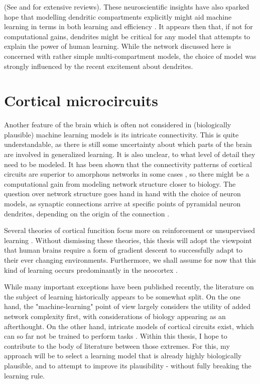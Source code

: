 (See \citep{Larkum2022} and \citep{Poirazi2020} for extensive reviews). These neuroscientific insights have also sparked
hope that modelling dendritic compartments explicitly might aid machine learning in terms in both learning and
efficiency \citep{Chavlis2021,guerguiev2017towards,Richards2019,Eyal2018}. It appears then that, if not for
computational gains, dendrites might be critical for any model that attempts to explain the power of human learning.
While the network discussed here is concerned with rather simple multi-compartment models, the choice of model was
strongly influenced by the recent excitement about dendrites.




\section{Cortical microcircuits}

Another feature of the brain which is often not considered in (biologically plausible) machine learning models is its
intricate connectivity. This is quite understandable, as there is still some uncertainty about which parts of the brain
are involved in generalized learning. It is also unclear, to what level of detail they need to be modeled. It has been
shown that the connectivity patterns of cortical circuits are superior to amorphous networks in some cases
\citep{haeusler2007statistical}, so there might be a computational gain from modeling network structure closer to
biology. The question over network structure goes hand in hand with the choice of neuron models, as synaptic connections
arrive at specific points of pyramidal neuron dendrites, depending on the origin of the connection
\citep{felleman1991distributed,Ishizuka1995,Larkum2018}.

Several theories of cortical funcition focus more on reinforcement \citep{Legenstein2008} or unsupervised learning
\citep{George2009,haeusler2017}. Without dismissing these theories, this thesis will adopt the viewpoint that human
brains require a form of gradient descent to successfully adapt to their ever changing environments. Furthermore, we
shall assume for now that this kind of learning occurs predominantly in the neocortex \citep{Marblestone2016}.

While many important exceptions have been published recently, the literature on the subject of learning historically
appears to be somewhat split. On the one hand, the "machine-learning" point of view largely considers the utility of
added network complexity first, with considerations of biology appearing as an afterthought\citeme. On the other hand,
intricate models of cortical circuits exist, which can so far not be trained to perform tasks
\cite{potjans2014cell,schmidt2018multi,van2022bringing}. Within this thesis, I hope to contribute to the body of
literature between those extremes. For this, my approach will be to select a learning model that is already highly
biologically plausible, and to attempt to improve its plausibility - without fully breaking the learning rule.

